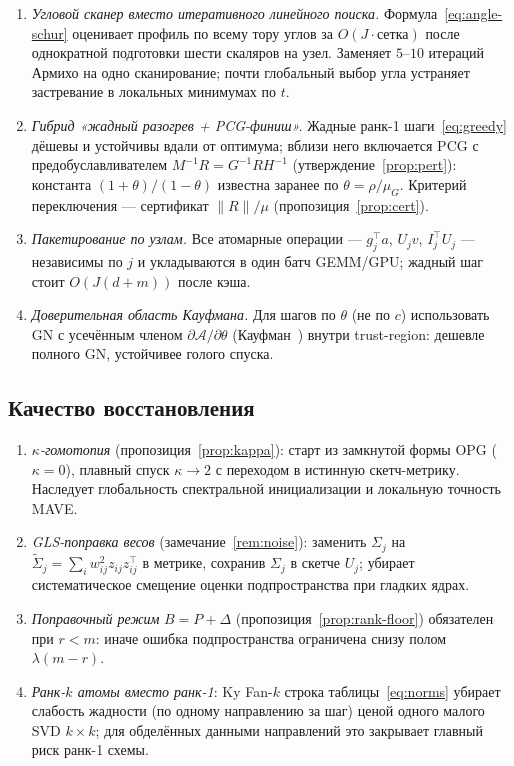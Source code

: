 \documentclass[11pt,a4paper]{article}
\newcommand{\T}{^{\!\top}}
\newcommand{\Aop}{\mathcal{A}}
\theoremstyle{plain}
\theoremstyle{definition}
\theoremstyle{remark}
\begin{document}
\begin{enumerate}[label=\textbf{C\arabic*.},leftmargin=2.6em]
\item \emph{Угловой сканер вместо итеративного линейного поиска.}
Формула~\eqref{eq:angle-schur} оценивает профиль по всему тору углов за
$O(J\cdot\text{сетка})$ после однократной подготовки шести скаляров на узел.
Заменяет $5$--$10$ итераций Армихо на одно сканирование; почти глобальный
выбор угла устраняет застревание в локальных минимумах по $t$.
\item \emph{Гибрид «жадный разогрев + PCG-финиш».}
Жадные ранк-1 шаги~\eqref{eq:greedy} дёшевы и устойчивы вдали от оптимума;
вблизи него включается PCG с предобуславливателем $M^{-1}R=G^{-1}RH^{-1}$
(утверждение~\ref{prop:pert}): константа $(1+\theta)/(1-\theta)$ известна
заранее по $\theta=\rho/\mu_G$. Критерий переключения --- сертификат
$\|R\|/\mu$ (пропозиция~\ref{prop:cert}).
\item \emph{Пакетирование по узлам.} Все атомарные операции
--- $g_j\T a$, $U_jv$, $I_j\T U_j$ --- независимы по $j$ и укладываются в
один батч GEMM/GPU; жадный шаг стоит $O(J(d+m))$ после кэша.
\item \emph{Доверительная область Кауфмана.} Для шагов по $\theta$ (не по
$c$) использовать GN с усечённым членом $\partial\Aop/\partial\theta$
(Кауфман~\cite{kaufman-1975}) внутри trust-region: дешевле полного GN,
устойчивее голого спуска.
\end{enumerate}

\subsection{Качество восстановления}

\begin{enumerate}[label=\textbf{Q\arabic*.},leftmargin=2.6em]
\item \emph{$\kappa$-гомотопия} (пропозиция~\ref{prop:kappa}): старт из
замкнутой формы OPG ($\kappa=0$), плавный спуск $\kappa\to2$ с переходом в
истинную скетч-метрику. Наследует глобальность спектральной инициализации и
локальную точность MAVE.
\item \emph{GLS-поправка весов} (замечание~\ref{rem:noise}): заменить
$\Sigma_j$ на $\widetilde\Sigma_j=\sum_iw_{ij}^2z_{ij}z_{ij}\T$ в метрике,
сохранив $\Sigma_j$ в скетче $U_j$; убирает систематическое смещение
оценки подпространства при гладких ядрах.
\item \emph{Поправочный режим} $B=P+\Delta$ (пропозиция~\ref{prop:rank-floor})
обязателен при $r<m$: иначе ошибка подпространства ограничена снизу
полом $\lambda(m-r)$.
\item \emph{Ранк-$k$ атомы вместо ранк-1}: Ky Fan-$k$ строка
таблицы~\eqref{eq:norms} убирает слабость жадности (по одному направлению за
шаг) ценой одного малого SVD $k\times k$; для обделённых данными направлений
это закрывает главный риск ранк-1 схемы.
\end{enumerate}
\end{document}
